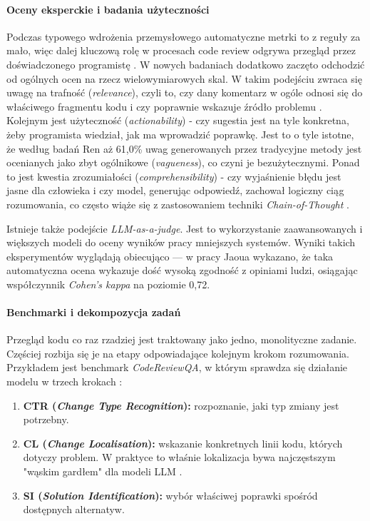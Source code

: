 \paragraph{Oceny eksperckie i badania użyteczności}
Podczas typowego wdrożenia przemysłowego automatyczne metrki to z reguły za mało, więc dalej kluczową rolę w procesach
code review odgrywa przegląd przez doświadczonego programistę \cite{Ramesh2025EricssonExperience}. 
W nowych badaniach dodatkowo zaczęto odchodzić od ogólnych ocen na rzecz wielowymiarowych skal.
W takim podejściu zwraca się uwagę na trafność (\textit{relevance}), czyli to, czy dany komentarz w 
ogóle odnosi się do właściwego fragmentu kodu i czy poprawnie wskazuje źródło problemu \cite{Yu2024Carllm, Ren2025HydraReviewer}.
Kolejnym jest użyteczność (\textit{actionability}) - czy sugestia jest na tyle konkretna, żeby programista wiedział, jak ma wprowadzić poprawkę.
Jest to o tyle istotne, że według badań Ren \cite{Ren2025HydraReviewer} aż 61,0\% uwag generowanych przez tradycyjne metody 
jest ocenianych jako zbyt ogólnikowe (\textit{vagueness}), co czyni je bezużytecznymi.
Ponad to jest kwestia zrozumiałości (\textit{comprehensibility}) - czy wyjaśnienie błędu jest jasne dla człowieka i
czy model, generując odpowiedź, zachował logiczny ciąg rozumowania, co często wiąże się z zastosowaniem
techniki \textit{Chain-of-Thought} \cite{Yu2024Carllm, Haider2024PromptingFineTuningRCG}.

Istnieje także podejście \textit{LLM-as-a-judge}. Jest to wykorzystanie zaawansowanych i większych modeli do oceny
wyników pracy mniejszych systemów. Wyniki takich eksperymentów wyglądają obiecująco — w pracy Jaoua \cite{Jaoua2025LLMStaticAnalyzersCR} wykazano, 
że taka automatyczna ocena wykazuje dość wysoką zgodność z opiniami ludzi, osiągając współczynnik \textit{Cohen's 
kappa} na poziomie 0,72.

\paragraph{Benchmarki i dekompozycja zadań}
Przegląd kodu co raz rzadziej jest traktowany jako jedno, monolityczne zadanie. Częściej 
rozbija się je na etapy odpowiadające kolejnym krokom rozumowania. Przykładem jest benchmark \textit{CodeReviewQA}, w 
którym sprawdza się działanie modelu w trzech krokach \cite{Lin2025CodeReviewQA}:
\begin{enumerate}
    \item \textbf{CTR (\textit{Change Type Recognition}):} rozpoznanie, jaki typ zmiany jest potrzebny.
    \item \textbf{CL (\textit{Change Localisation}):} wskazanie konkretnych linii kodu, których dotyczy problem. W 
praktyce to właśnie lokalizacja bywa najczęstszym "wąskim gardłem" dla modeli LLM \cite{Lin2025CodeReviewQA}.
    \item \textbf{SI (\textit{Solution Identification}):} wybór właściwej poprawki spośród dostępnych alternatyw.
\end{enumerate}

